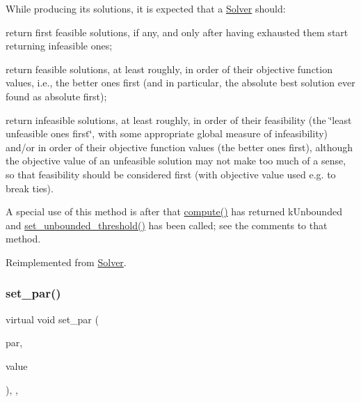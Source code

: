 While producing its solutions, it is expected that a \mbox{\hyperlink{class_s_m_spp__di__unipi__it_1_1_solver}{Solver}} should\+:


\begin{DoxyItemize}
\item return first feasible solutions, if any, and only after having exhausted them start returning infeasible ones;
\item return feasible solutions, at least roughly, in order of their objective function values, i.\+e., the better ones first (and in particular, the absolute best solution ever found as absolute first);
\item return infeasible solutions, at least roughly, in order of their feasibility (the \char`\"{}least unfeasible ones first\char`\"{}, with some appropriate global measure of infeasibility) and/or in order of their objective function values (the better ones first), although the objective value of an unfeasible solution may not make too much of a sense, so that feasibility should be considered first (with objective value used e.\+g. to break ties).
\end{DoxyItemize}

A special use of this method is after that \mbox{\hyperlink{class_s_m_spp__di__unipi__it_1_1_m_c_f_solver_afc8ff54ab05d22f4cca0fb0bfbeb7a49}{compute()}} has returned k\+Unbounded and \mbox{\hyperlink{class_s_m_spp__di__unipi__it_1_1_solver_ae1717d1363782e086aa797e7437c0352}{set\+\_\+unbounded\+\_\+threshold()}} has been called; see the comments to that method. 

Reimplemented from \mbox{\hyperlink{class_s_m_spp__di__unipi__it_1_1_solver_af109b504a566c90a4ea45c1574c128fe}{Solver}}.

\mbox{\label{class_s_m_spp__di__unipi__it_1_1_m_c_f_solver_ab8ce512bc43533d07e9ebf93d44c515d}} 
\subsubsection{\texorpdfstring{set\+\_\+par()}{set\_par()}\hspace{0.1cm}{\footnotesize\ttfamily [1/2]}}
{\footnotesize\ttfamily virtual void set\+\_\+par (\begin{DoxyParamCaption}\item[{const \mbox{\hyperlink{class_s_m_spp__di__unipi__it_1_1_thin_compute_interface_aa3d710629ad8c434286726ad810c3b47}{idx\+\_\+type}}}]{par,  }\item[{const int}]{value }\end{DoxyParamCaption})\hspace{0.3cm}{\ttfamily [inline]}, {\ttfamily [override]}, {\ttfamily [virtual]}}



